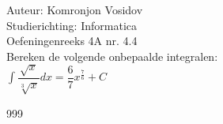 \documentclass[a4paper]{article}
\newcommand{\dint}{\displaystyle\int}
\begin{document}
	
	\noindent \large Auteur: Komronjon Vosidov \\
	\noindent \large Studierichting: Informatica\\
	\noindent \large Oefeningenreeks 4A nr. 4.4\\
	
	
	\medskip
	\normalsize
	Bereken de volgende onbepaalde integralen:\\
	
$ \dint \dfrac{\sqrt{x}}{\sqrt[3]{x}}  dx = \dfrac{6}{7} x^{\tfrac{7}{6}} + C $
	
	
	
	
	
	
	
	\begin{thebibliography}{999}
	\end{thebibliography}		
\end{document}
